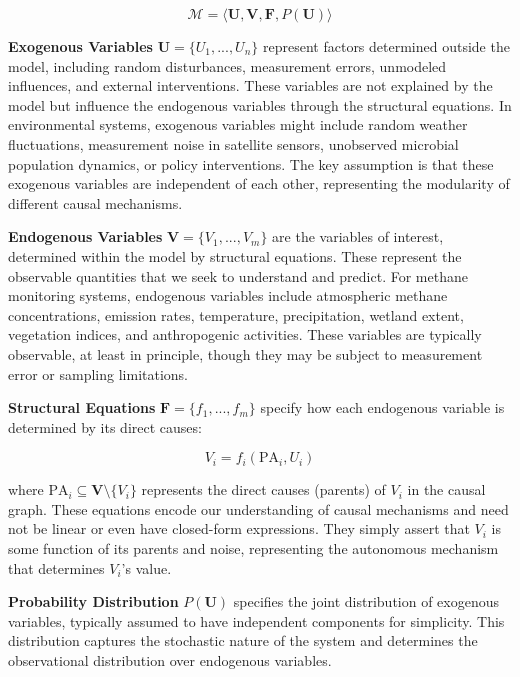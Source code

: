 \begin{equation}
	\mathcal{M} = \langle \mathbf{U}, \mathbf{V}, \mathbf{F}, P(\mathbf{U}) \rangle
\end{equation}

\textbf{Exogenous Variables} $\mathbf{U} = \{U_1, ..., U_n\}$ represent factors determined outside the model, including random disturbances, measurement errors, unmodeled influences, and external interventions. These variables are not explained by the model but influence the endogenous variables through the structural equations. In environmental systems, exogenous variables might include random weather fluctuations, measurement noise in satellite sensors, unobserved microbial population dynamics, or policy interventions. The key assumption is that these exogenous variables are independent of each other, representing the modularity of different causal mechanisms.

\textbf{Endogenous Variables} $\mathbf{V} = \{V_1, ..., V_m\}$ are the variables of interest, determined within the model by structural equations. These represent the observable quantities that we seek to understand and predict. For methane monitoring systems, endogenous variables include atmospheric methane concentrations, emission rates, temperature, precipitation, wetland extent, vegetation indices, and anthropogenic activities. These variables are typically observable, at least in principle, though they may be subject to measurement error or sampling limitations.

\textbf{Structural Equations} $\mathbf{F} = \{f_1, ..., f_m\}$ specify how each endogenous variable is determined by its direct causes:

\begin{equation}
	V_i = f_i(\text{PA}_i, U_i)
\end{equation}

where $\text{PA}_i \subseteq \mathbf{V} \setminus \{V_i\}$ represents the direct causes (parents) of $V_i$ in the causal graph. These equations encode our understanding of causal mechanisms and need not be linear or even have closed-form expressions. They simply assert that $V_i$ is some function of its parents and noise, representing the autonomous mechanism that determines $V_i$'s value.

\textbf{Probability Distribution} $P(\mathbf{U})$ specifies the joint distribution of exogenous variables, typically assumed to have independent components for simplicity. This distribution captures the stochastic nature of the system and determines the observational distribution over endogenous variables.

